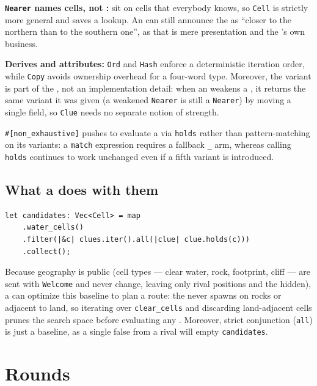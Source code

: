 \documentclass{article}
\begin{document}
\textbf{\texttt{Nearer} names cells, not \islands{}:} \islands{} sit on cells that everybody knows, so \texttt{Cell} is strictly more general and saves a lookup.
An \island{} can still announce the \clue{} as ``closer to the northern \island{} than to the southern one'', as that is mere presentation and the \island{}'s own business.

\textbf{Derives and attributes:} \texttt{Ord} and \texttt{Hash} enforce a deterministic iteration order, while \texttt{Copy} avoids ownership overhead for a four-word type.
Moreover, the variant is part of the \clue{}, not an implementation detail: when an \island{} weakens a \clue{}, it returns the same variant it was given (a weakened \texttt{Nearer} is still a \texttt{Nearer}) by moving a single field, so \texttt{Clue} needs no separate notion of strength.

\texttt{\#[non\_exhaustive]} pushes \ships{} to evaluate a \clue{} via \texttt{holds} rather than pattern-matching on its variants: a \texttt{match} expression requires a fallback \texttt{\_} arm, whereas calling \texttt{holds} continues to work unchanged even if a fifth variant is introduced.

\subsection{What a \ship{} does with them}

\begin{lstlisting}
let candidates: Vec<Cell> = map
    .water_cells()
    .filter(|&c| clues.iter().all(|clue| clue.holds(c)))
    .collect();
\end{lstlisting}

Because geography is public (cell types --- clear water, rock, \island{} footprint, cliff --- are sent with \texttt{Welcome} and never change, leaving only rival positions and the \treasure{} hidden), a \ship{} can optimize this baseline to plan a route: the \treasure{} never spawns on rocks or adjacent to land, so iterating over \texttt{clear\_cells} and discarding land-adjacent cells prunes the search space before evaluating any \clue{}.
Moreover, strict conjunction (\texttt{all}) is just a baseline, as a single false \clue{} from a rival will empty \texttt{candidates}.


\newpage
\section{Rounds}
\label{proto:rounds}
\end{document}
